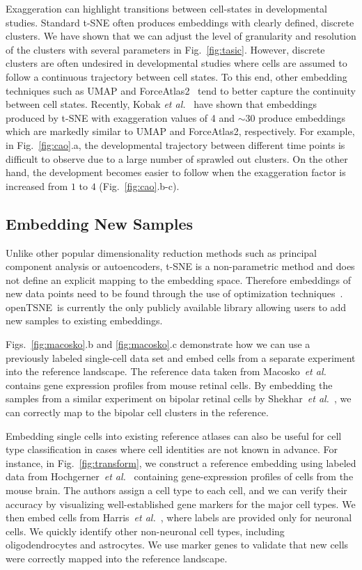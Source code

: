 \documentclass[twocolumn]{bmcart}
\newcommand{\opentsne}{\textsf{openTSNE}}
\begin{document}
Exaggeration can highlight transitions between cell-states in
developmental studies. Standard t-SNE often produces embeddings with
clearly defined, discrete clusters. We have shown that we can adjust the level
of granularity and resolution of the clusters with several parameters in Fig.~\ref{fig:tasic}. However,
discrete clusters are often undesired in developmental studies where cells are assumed to follow a continuous trajectory between cell states. To this end, other
embedding techniques such as UMAP and ForceAtlas2~\cite{jacomy2014forceatlas2} tend to better capture the continuity between cell
states. Recently, Kobak \textit{et al.}~\cite{TODO} have shown that embeddings
produced by t-SNE with exaggeration values of 4 and $\sim30$ produce embeddings
which are markedly similar to UMAP and ForceAtlas2, respectively. For example,
in Fig.~\ref{fig:cao}.a, the developmental trajectory between different time
points is difficult to observe due to a large number of sprawled out clusters.
On the other hand, the development becomes easier to follow when the
exaggeration factor is increased from $1$ to $4$ (Fig.~\ref{fig:cao}.b-c). 

\subsection*{Embedding New Samples}

Unlike other popular dimensionality reduction methods such as principal
component analysis or autoencoders, t-SNE is a non-parametric method and does
not define an explicit mapping to the embedding space. Therefore embeddings of
new data points need to be found through the use of optimization
techniques~\cite{policar2019embedding}. \opentsne\ is currently the only
publicly available library allowing users to add new samples to existing
embeddings.

Figs.~\ref{fig:macosko}.b and \ref{fig:macosko}.c demonstrate how we can use a
previously labeled single-cell data set and embed cells from a separate
experiment into the reference landscape. The reference data taken from Macosko~\textit{et al.}~\cite{macosko2015highly} contains gene expression profiles from
mouse retinal cells. By embedding the samples from a similar experiment on bipolar retinal cells by Shekhar~\textit{et al.}~\cite{shekhar2016comprehensive}, 
we can correctly map to the bipolar cell clusters in the reference.

Embedding single cells into existing reference atlases can also be useful for
cell type classification in cases where cell identities are not known in
advance. For instance, in Fig.~\ref{fig:transform}, we construct a reference
embedding using labeled data from Hochgerner~\textit{et
al.}~\cite{hochgerner2018conserved} containing gene-expression profiles of
cells from the mouse brain. The authors assign a cell type to each cell, and
we can verify their accuracy by visualizing well-established gene markers for the
major cell types. We then embed cells from Harris~\textit{et
al.}~\cite{harris2018classes}, where labels are provided only for neuronal
cells. We quickly identify other non-neuronal cell types, including
oligodendrocytes and astrocytes. We use marker genes to validate that new cells
were correctly mapped into the reference landscape.
\end{document}
